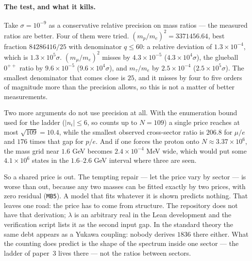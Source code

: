 \documentclass[aps,prd,preprint,superscriptaddress,amsmath,amssymb]{revtex4-2}
\begin{document}
\paragraph{The test, and what it kills.}
Take $\sigma=10^{-9}$ as a conservative relative precision on mass ratios ---
the measured ratios are better.  Four of them were tried.
$(m_p/m_e)^2=3371456.64$, best fraction $84286416/25$ with denominator
$q\le60$: a relative deviation of $1.3\times10^{-4}$, which is
$1.3\times10^{5}\sigma$.  $(m_\mu/m_e)^2$ misses by $4.3\times10^{-5}$
($4.3\times10^{4}\sigma$), the glueball $0^{++}$ ratio by $9.6\times10^{-5}$
($9.6\times10^{4}\sigma$), and $m_\tau/m_e$ by $2.5\times10^{-4}$
($2.5\times10^{5}\sigma$).  The smallest denominator that comes close is $25$,
and it misses by four to five orders of magnitude more than the precision
allows, so this is not a matter of better measurements.

Two more arguments do not use precision at all.  With the enumeration bound
used for the ladder ($|n_i|\le6$, so counts up to $N=109$) a single price
reaches at most $\sqrt{109}=10.4$, while the smallest observed cross-sector
ratio is $206.8$ for $\mu/e$ and $176$ times that gap for $p/e$.  And if one
forces the proton onto $N\approx3.37\times10^{6}$, the mass grid near $1.6$
GeV becomes $2.4\times10^{-4}$ MeV wide, which would put some
$4.1\times10^{6}$ states in the $1.6$--$2.6$ GeV interval where three are
seen.

So a shared price is out.  The tempting repair --- let the price vary by
sector --- is worse than out, because any two masses can be fitted exactly by
two prices, with zero residual (\texttt{MB5}).  A model that fits whatever it
is shown predicts nothing.  That leaves one road: the price has to come from
structure.  The repository does not have that derivation; $\lambda$ is an
arbitrary real in the Lean development and the verification script lists it as
the second input gap.  In the standard theory the same debt appears as a
Yukawa coupling: nobody derives $1836$ there either.  What the counting does
predict is the shape of the spectrum inside one sector --- the ladder of
paper~3 lives there --- not the ratios between sectors.
\end{document}
